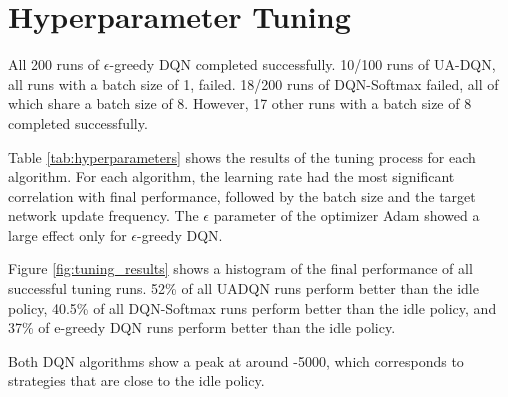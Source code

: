 \section{Hyperparameter Tuning}
All 200 runs of $\epsilon$-greedy DQN completed successfully.
10/100 runs of UA-DQN, all runs with a batch size of 1, failed.
18/200 runs of DQN-Softmax failed, all of which share a batch size of 8.
However, 17 other runs with a batch size of 8 completed successfully.

Table \ref{tab:hyperparameters} shows the results of the tuning process for each algorithm.
For each algorithm, the learning rate had the most significant correlation with final performance, followed by the batch size and the target network update frequency.
The $\epsilon$ parameter of the optimizer Adam showed a large effect only for $\epsilon$-greedy DQN.

Figure \ref{fig:tuning_results} shows a histogram of the final performance of all successful tuning runs.
52\% of all UADQN runs perform better than the idle policy, 40.5\% of all DQN-Softmax  runs perform better than the idle policy, and 37\% of e-greedy DQN runs perform better than the idle policy.

Both DQN algorithms show a peak at around -5000, which corresponds to strategies that are close to the idle policy.

